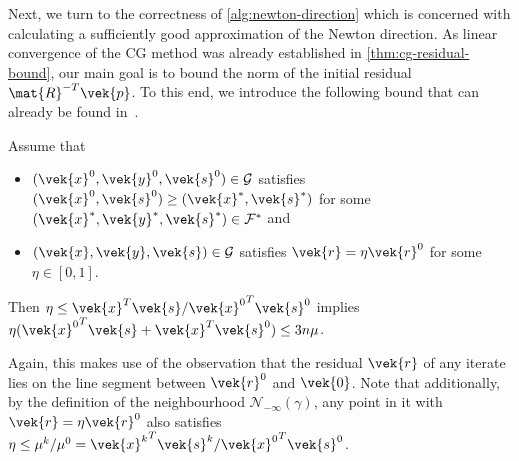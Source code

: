 Next, we turn to the correctness of \cref{alg:newton-direction} which is concerned with calculating a sufficiently good approximation of the Newton direction.
As linear convergence of the CG method was already established in \cref{thm:cg-residual-bound}, our main goal is to bound the norm of the initial residual \(\mat{R}^{-T}\vek{p}\).
To this end, we introduce the following bound that can already be found in~\cite{Monteiro-ConvergenceAnalysisLongStepInfeasibleIPMs}.

\begin{lemma}\label{thm:eta-bound}
  Assume that
  \begin{itemize}
    \item \((\vek{x}^0, \vek{y}^0, \vek{s}^0) \in \mathcal{G}\) satisfies \((\vek{x}^0, \vek{s}^0) \geq (\vek{x}^*, \vek{s}^*)\) for some \((\vek{x}^*, \vek{y}^*, \vek{s}^*) \in \mathcal{F}^*\) and
    \item \((\vek{x}, \vek{y}, \vek{s}) \in \mathcal{G}\) satisfies \(\vek{r} = \eta \vek{r}^0\) for some \(\eta \in [0, 1]\).
  \end{itemize}
  Then \(\eta \leq \vek{x}^T \vek{s} / {\vek{x}^0}^T \vek{s}^0\) implies \(\eta ({\vek{x}^0}^T \vek{s} + \vek{x}^T {\vek{s}^0}) \leq 3 n \mu\).
\end{lemma}

Again, this makes use of the observation that the residual \(\vek{r}\) of any iterate lies on the line segment between \(\vek{r}^0\) and \(\vek{0}\).
Note that additionally, by the definition of the neighbourhood \(\mathcal{N}_{-\infty}(\gamma)\), any point in it with \(\vek{r} = \eta \vek{r}^0\) also satisfies \(\eta \leq \mu^k / \mu^0 = {\vek{x}^k}^T \vek{s}^k / {\vek{x}^0}^T \vek{s}^0\).

